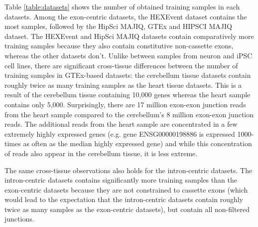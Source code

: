 Table \ref{table:datasets} shows the number of obtained training samples in each datasets. Among the exon-centric datasets, the HEXEvent dataset contains the most samples, followed by the HipSci MAJIQ, GTEx and HIPSCI MAJIQ dataset. The HEXEvent and HipSci MAJIQ datasets contain comparatively more training samples because they also contain constitutive non-cassette exons, whereas the other datasets don't. Unlike between samples from neuron and iPSC cell lines, there are significant cross-tissue differences between the number of training samples in GTEx-based datasets: the cerebellum tissue datasets contain roughly twice as many training samples as the heart tissue datasets. This is a result of the cerebellum tissue containing 10,000 genes whereas the heart sample contains only 5,000. Surprisingly, there are 17 million exon-exon junction reads from the heart sample compared to the cerebellum's 8 million exon-exon junction reads. The additional reads from the heart sample are concentrated in a few extremely highly expressed genes (e.g. gene ENSG00000198886 is expressed 1000-times as often as the median highly expressed gene) and while this concentration of reads also appear in the cerebellum tissue, it is less extreme.

The same cross-tissue observations also holds for the intron-centric datasets. The intron-centric datasets contains significantly more training samples than the exon-centric datasets because they are not constrained to cassette exons (which would lead to the expectation that the intron-centric datasets contain roughly twice as many samples as the exon-centric datasets), but contain all non-filtered junctions. 
%


